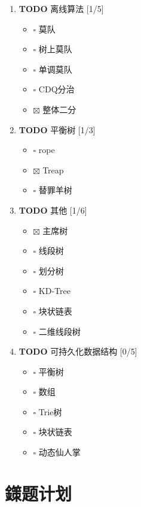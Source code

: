 \documentclass[11pt]{article}
\begin{document}
\begin{enumerate}
\item {\bfseries\sffamily TODO} 离线算法 [1/5]
\label{sec:org110af41}

\begin{itemize}
\item $\square$ 莫队
\item $\square$ 树上莫队
\item $\square$ 单调莫队
\item $\square$ CDQ分治
\item $\boxtimes$ 整体二分
\end{itemize}

\item {\bfseries\sffamily TODO} 平衡树 [1/3]
\label{sec:org26bed65}

\begin{itemize}
\item $\square$ rope
\item $\boxtimes$ Treap
\item $\square$ 替罪羊树
\end{itemize}

\item {\bfseries\sffamily TODO} 其他 [1/6]
\label{sec:orge6578ac}

\begin{itemize}
\item $\boxtimes$ 主席树
\item $\square$ 线段树
\item $\square$ 划分树
\item $\square$ KD-Tree
\item $\square$ 块状链表
\item $\square$ 二维线段树
\end{itemize}

\item {\bfseries\sffamily TODO} 可持久化数据结构 [0/5]
\label{sec:org5cdcd10}

\begin{itemize}
\item $\square$ 平衡树
\item $\square$ 数组
\item $\square$ Trie树
\item $\square$ 块状链表
\item $\square$ 动态仙人掌
\end{itemize}
\end{enumerate}

\section{鏼题计划}
\label{sec:org4780a72}
\end{document}

